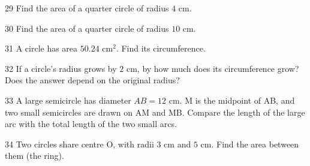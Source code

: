 \gap
\begin{probbox}{29}{\relax}
Find the area of a quarter circle of radius $4$ cm.
\end{probbox}
\gap
\begin{probbox}{30}{\relax}
Find the area of a quarter circle of radius $10$ cm.
\end{probbox}
\begin{probbox}{31}{}
A circle has area $50.24$ cm$^2$. Find its circumference.
\end{probbox}
\gap
\begin{probbox}{32}{}
If a circle's radius grows by $2$ cm, by how much does its circumference grow? Does the answer depend on the original radius?
\end{probbox}
\gap
\begin{probbox}{33}{}
A large semicircle has diameter $AB=12$ cm. M is the midpoint of AB, and two small semicircles are drawn on AM and MB. Compare the length of the large arc with the total length of the two small arcs.
\end{probbox}
\gap
\begin{probbox}{34}{}
Two circles share centre O, with radii $3$ cm and $5$ cm. Find the area between them (the ring).
\end{probbox}
\gap
